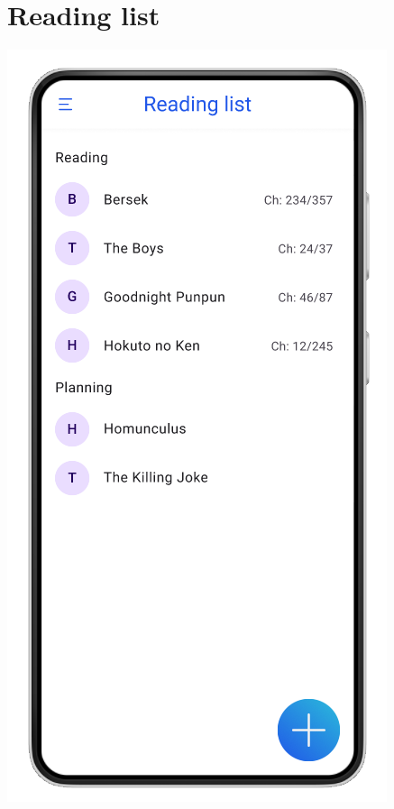 \documentclass{report}
\begin{document}
\section{Reading list}

\begin{center}
   \includegraphics[scale=0.4]{reading_list.png}
\end{center}
\end{document}
